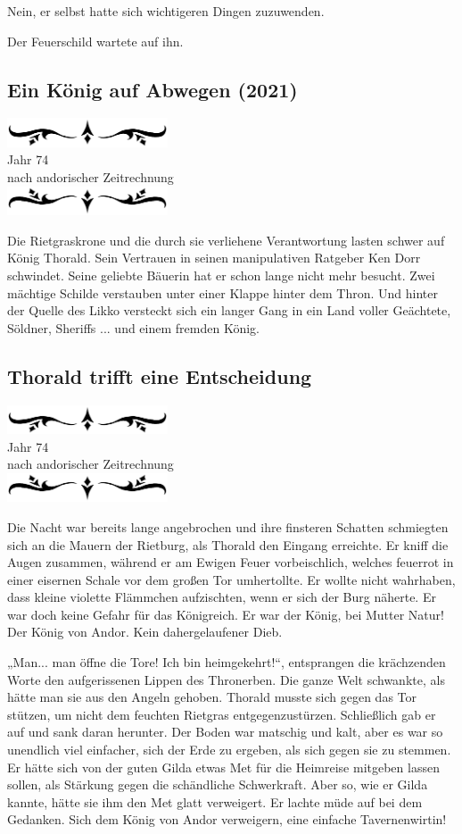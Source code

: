\documentclass[10pt, a4paper, oneside]{book}
\newcommand{\az}[1]{%
    \begin{center}
        \includegraphics[width=180px]{Das Erbe des Wunderkindes/verzierung1.png}\\
        {\Huge #1} \\
        {nach andorischer Zeitrechnung}\\
        \includegraphics[width=180px]{Das Erbe des Wunderkindes/verzierung2.png}
    \end{center}
    \extramarks{}{#1 a.Z.}
}
\begin{document}
Nein, er selbst hatte sich wichtigeren Dingen zuzuwenden.

Der Feuerschild wartete auf ihn.











\begin{chapterbox}
    \chapter{Ein König auf Abwegen (2021)}
    \label{Ein König auf Abwegen (2021)}
    \az{Jahr 74}
    Die Rietgraskrone und die durch sie verliehene Verantwortung lasten schwer auf König Thorald. Sein Vertrauen in seinen manipulativen Ratgeber Ken Dorr schwindet. Seine geliebte Bäuerin hat er schon lange nicht mehr besucht. Zwei mächtige Schilde verstauben unter einer Klappe hinter dem Thron. Und hinter der Quelle des Likko versteckt sich ein langer Gang in ein Land voller Geächtete, Söldner, Sheriffs ... und einem fremden König.
\end{chapterbox}



\section{Thorald trifft eine Entscheidung}

\az{Jahr 74}

Die Nacht war bereits lange angebrochen und ihre finsteren Schatten schmiegten sich an die Mauern der Rietburg, als Thorald den Eingang erreichte. Er kniff die Augen zusammen, während er am Ewigen Feuer vorbeischlich, welches feuerrot in einer eisernen Schale vor dem großen Tor umhertollte. Er wollte nicht wahrhaben, dass kleine violette Flämmchen aufzischten, wenn er sich der Burg näherte. Er war doch keine Gefahr für das Königreich. Er war der König, bei Mutter Natur! Der König von Andor. Kein dahergelaufener Dieb.

„Man... man öffne die Tore! Ich bin heimgekehrt!“, entsprangen die krächzenden Worte den aufgerissenen Lippen des Thronerben. Die ganze Welt schwankte, als hätte man sie aus den Angeln gehoben. Thorald musste sich gegen das Tor stützen, um nicht dem feuchten Rietgras entgegenzustürzen. Schließlich gab er auf und sank daran herunter. Der Boden war matschig und kalt, aber es war so unendlich viel einfacher, sich der Erde zu ergeben, als sich gegen sie zu stemmen. Er hätte sich von der guten Gilda etwas Met für die Heimreise mitgeben lassen sollen, als Stärkung gegen die schändliche Schwerkraft. Aber so, wie er Gilda kannte, hätte sie ihm den Met glatt verweigert. Er lachte müde auf bei dem Gedanken. Sich dem König von Andor verweigern, eine einfache Tavernenwirtin!
\end{document}
